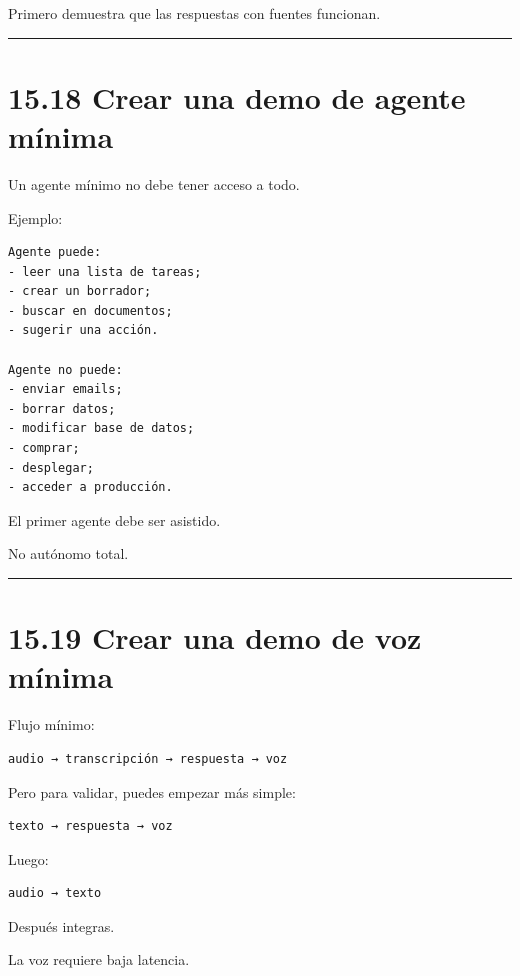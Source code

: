 Primero demuestra que las respuestas con fuentes funcionan.

\begin{center}\rule{0.5\linewidth}{0.5pt}\end{center}

\section{15.18 Crear una demo de agente
mínima}\label{crear-una-demo-de-agente-muxednima}

Un agente mínimo no debe tener acceso a todo.

Ejemplo:

\begin{lstlisting}
Agente puede:
- leer una lista de tareas;
- crear un borrador;
- buscar en documentos;
- sugerir una acción.

Agente no puede:
- enviar emails;
- borrar datos;
- modificar base de datos;
- comprar;
- desplegar;
- acceder a producción.
\end{lstlisting}

El primer agente debe ser asistido.

No autónomo total.

\begin{center}\rule{0.5\linewidth}{0.5pt}\end{center}

\section{15.19 Crear una demo de voz
mínima}\label{crear-una-demo-de-voz-muxednima}

Flujo mínimo:

\begin{lstlisting}
audio → transcripción → respuesta → voz
\end{lstlisting}

Pero para validar, puedes empezar más simple:

\begin{lstlisting}
texto → respuesta → voz
\end{lstlisting}

Luego:

\begin{lstlisting}
audio → texto
\end{lstlisting}

Después integras.

La voz requiere baja latencia.

